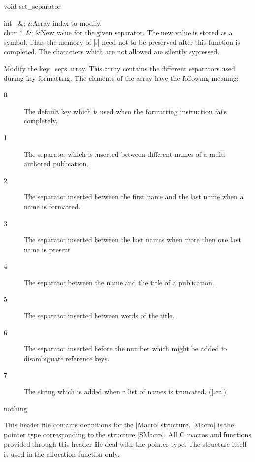 \begin{Function}{void }{set\_separator}
  \begin{Arguments}
    int \ 	&;	&Array index to modify.\\
    char *\ 	&;	&New value for the given separator. The new value is
stored as a symbol. Thus the memory of |s| need not to
be preserved after this function is completed.
The characters which are not allowed are silently sypressed.
  \end{Arguments}%
  Modify the key\_seps array. This array contains the
  different separators used during key formatting. The
  elements of the array have the following meaning:
  \begin{description}
  \item[0] The default key which is used when the
  formatting instruction fails completely.
  \item[1] The separator which is inserted between
  different names of a multi-authored publication.
  \item[2] The separator inserted between the first name
  and the last name when a name is formatted.
  \item[3] The separator inserted between the last names
  when more then one last name is present
  \item[4] The separator between the name and the title
  of a publication.
  \item[5] The separator inserted between words of the
  title.
  \item[6] The separator inserted before the number
  which might be added to disambiguate reference keys.
  \item[7] The string which is added when a list of
  names is truncated. (|.ea|)
  \end{description}
  \begin{Result}
    nothing
  \end{Result}
\end{Function}


This header file contains definitions for the |Macro|
structure. |Macro| is the pointer type corresponding to the
structure |SMacro|. All C macros and functions provided
through this header file deal with the pointer type. The
structure itself is used in the allocation function only.


